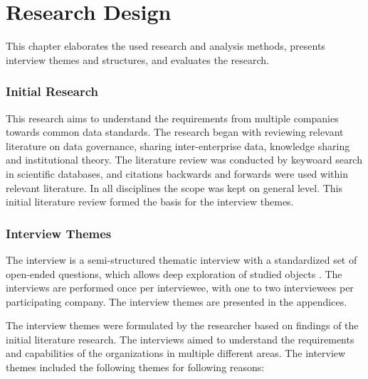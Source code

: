 \chapter{Research Design}
\label{chapter:Research Design} 

This chapter elaborates the used research and analysis methods, presents interview themes and structures, and evaluates the research. 

\subsection{Initial Research}
This research aims to understand the requirements from multiple companies towards common data standards. The research began with reviewing relevant literature on data governance, sharing inter-enterprise data, knowledge sharing and institutional theory. The literature review was conducted by keywoard search in scientific databases, and citations backwards and forwards were used within relevant literature. In all disciplines the scope was kept on general level. This initial literature review formed the basis for the interview themes.

\subsection{Interview Themes}
The interview is a semi-structured thematic interview \cite{hirsjarvi2000tutkimushaastattelu} with a standardized set of open-ended questions, which allows deep exploration of studied objects \cite{patton2002qualitative}. The interviews are performed once per interviewee, with one to two interviewees per participating company. The interview themes are presented in the appendices.

The interview themes were formulated by the researcher based on findings of the initial literature research. The interviews aimed to understand the requirements and capabilities of the organizations in multiple different areas. The interview themes included the following themes for following reasons:

